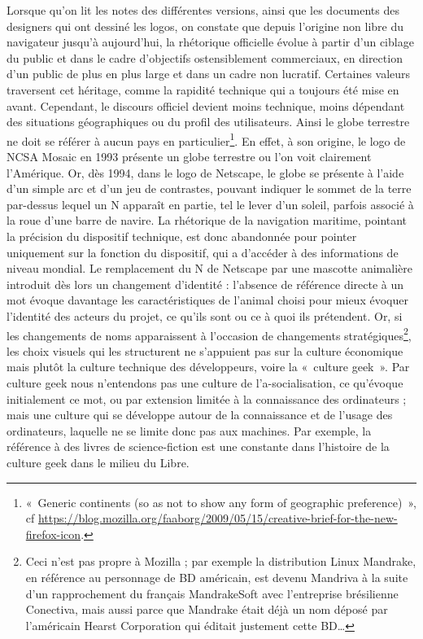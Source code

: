 \documentclass{FramateX}
\begin{document}
\begin{refsection}
Lorsque qu'on lit les notes des différentes versions,
ainsi que les documents des designers qui ont dessiné les logos, on constate que depuis l'origine non libre du navigateur
jusqu'à aujourd'hui, la rhétorique officielle évolue à partir d'un
ciblage du public et dans le cadre d'objectifs ostensiblement
commerciaux, en direction d'un public de plus en plus large et dans un
cadre non lucratif. Certaines valeurs traversent cet héritage, comme la
rapidité technique qui a toujours été mise en avant. Cependant, le
discours officiel devient moins technique, moins dépendant des
situations géographiques ou du profil des utilisateurs. Ainsi le globe
terrestre ne doit se référer à aucun pays en particulier\footnote{«~Generic continents (so as not to show any form of geographic preference)~», cf \url{https://blog.mozilla.org/faaborg/2009/05/15/creative-brief-for-the-new-firefox-icon}.}. En effet, à son origine, le logo de NCSA Mosaic en 1993 présente un
globe terrestre ou l'on voit clairement l'Amérique. Or, dès 1994, dans
le logo de Netscape, le globe se présente à l'aide d'un simple arc et
d'un jeu de contrastes, pouvant indiquer le sommet de la terre
par-dessus lequel un N apparaît en partie, tel le lever d'un soleil,
parfois associé à la roue d'une barre de navire. La rhétorique de la
navigation maritime, pointant la précision du dispositif technique, est
donc abandonnée pour pointer uniquement sur la fonction du dispositif,
qui a d'accéder à des informations de niveau mondial. Le remplacement
du N de Netscape par une mascotte animalière introduit dès lors un
changement d'identité : l'absence de référence directe à un mot évoque
davantage les caractéristiques de l'animal choisi pour mieux évoquer
l'identité des acteurs du projet, ce qu'ils sont ou ce à quoi ils
prétendent. Or, si les changements de noms apparaissent à l'occasion de
changements stratégiques\footnote{Ceci n'est pas
propre à Mozilla ; par exemple la distribution Linux Mandrake, en
référence au personnage de BD américain, est devenu Mandriva à la suite
d'un rapprochement du français MandrakeSoft avec l'entreprise
brésilienne Conectiva, mais aussi parce que Mandrake était déjà un nom
déposé par l'américain Hearst Corporation qui éditait justement cette
BD\ldots}, les choix visuels qui les structurent ne s'appuient pas sur la
culture économique mais plutôt la culture technique des développeurs,
voire la «~culture geek~». Par culture geek nous n'entendons pas une
culture de l'a-socialisation, ce qu'évoque initialement ce mot, ou par
extension limitée à la connaissance des ordinateurs ; mais une culture
qui se développe autour de la connaissance et de l'usage des
ordinateurs, laquelle ne se limite donc pas aux machines. Par exemple,
la référence à des livres de science-fiction est une constante dans
l'histoire de la culture geek dans le milieu du Libre. 


\end{refsection}
\end{document}

